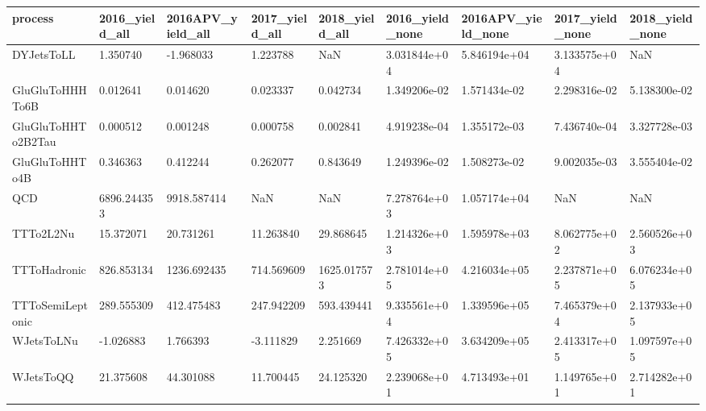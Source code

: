 \begin{tabular}{lllllllll}
\toprule
           process & 2016\_yield\_all & 2016APV\_yield\_all & 2017\_yield\_all & 2018\_yield\_all & 2016\_yield\_none & 2016APV\_yield\_none & 2017\_yield\_none & 2018\_yield\_none \\
\midrule
        DYJetsToLL &       1.350740 &         -1.968033 &       1.223788 &            NaN &    3.031844e+04 &       5.846194e+04 &    3.133575e+04 &             NaN \\
   GluGluToHHHTo6B &       0.012641 &          0.014620 &       0.023337 &       0.042734 &    1.349206e-02 &       1.571434e-02 &    2.298316e-02 &    5.138300e-02 \\
GluGluToHHTo2B2Tau &       0.000512 &          0.001248 &       0.000758 &       0.002841 &    4.919238e-04 &       1.355172e-03 &    7.436740e-04 &    3.327728e-03 \\
    GluGluToHHTo4B &       0.346363 &          0.412244 &       0.262077 &       0.843649 &    1.249396e-02 &       1.508273e-02 &    9.002035e-03 &    3.555404e-02 \\
               QCD &    6896.244353 &       9918.587414 &            NaN &            NaN &    7.278764e+03 &       1.057174e+04 &             NaN &             NaN \\
         TTTo2L2Nu &      15.372071 &         20.731261 &      11.263840 &      29.868645 &    1.214326e+03 &       1.595978e+03 &    8.062775e+02 &    2.560526e+03 \\
      TTToHadronic &     826.853134 &       1236.692435 &     714.569609 &    1625.017573 &    2.781014e+05 &       4.216034e+05 &    2.237871e+05 &    6.076234e+05 \\
  TTToSemiLeptonic &     289.555309 &        412.475483 &     247.942209 &     593.439441 &    9.335561e+04 &       1.339596e+05 &    7.465379e+04 &    2.137933e+05 \\
        WJetsToLNu &      -1.026883 &          1.766393 &      -3.111829 &       2.251669 &    7.426332e+05 &       3.634209e+05 &    2.413317e+05 &    1.097597e+05 \\
         WJetsToQQ &      21.375608 &         44.301088 &      11.700445 &      24.125320 &    2.239068e+01 &       4.713493e+01 &    1.149765e+01 &    2.714282e+01 \\
\bottomrule
\end{tabular}
